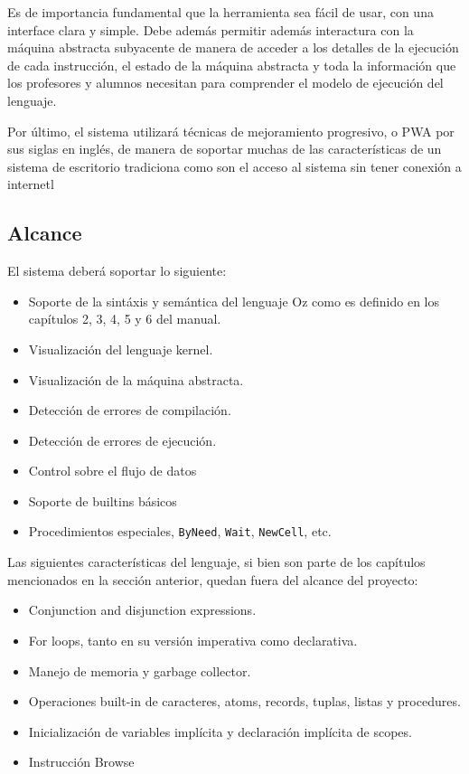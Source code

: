 \documentclass[a4paper,11pt]{article}
\begin{document}
Es de importancia fundamental que la herramienta sea fácil de usar, con una interface clara y simple. Debe además permitir además interactura con la máquina abstracta subyacente de manera de acceder a los detalles de la ejecución de cada instrucción, el estado de la máquina abstracta y toda la información que los profesores y alumnos necesitan para comprender el modelo de ejecución del lenguaje.

Por último, el sistema utilizará técnicas de mejoramiento progresivo, o PWA por sus siglas en inglés, de manera de soportar muchas de las características de un sistema de escritorio tradiciona como son el acceso al sistema sin tener conexión a internetl

\subsection{Alcance}

El sistema deberá soportar lo siguiente:

\begin{itemize}
    \item Soporte de la sintáxis y semántica del lenguaje Oz como es definido en los capítulos 2, 3, 4, 5 y 6 del manual.
    \item Visualización del lenguaje kernel.
    \item Visualización de la máquina abstracta.
    \item Detección de errores de compilación.
    \item Detección de errores de ejecución.
    \item Control sobre el flujo de datos
    \item Soporte de builtins básicos
    \item Procedimientos especiales, \texttt{ByNeed}, \texttt{Wait}, \texttt{NewCell}, etc. 
\end{itemize}

Las siguientes características del lenguaje, si bien son parte de los capítulos mencionados en la sección anterior, quedan fuera del alcance del proyecto:

\begin{itemize}
    \item Conjunction and disjunction expressions.
    \item For loops, tanto en su versión imperativa como declarativa.
    \item Manejo de memoria y garbage collector.
    \item Operaciones built-in de caracteres, atoms, records, tuplas, listas y procedures.
    \item Inicialización de variables implícita y declaración implícita de scopes.
    \item Instrucción Browse
\end{itemize}
\end{document}
